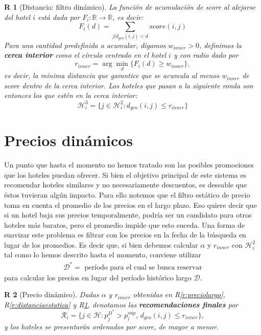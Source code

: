 \documentclass[12pt]{report}
\newcommand{\R}{\mathbb{R}}
\newcommand{\HH}{\mathcal{H}}
\newcommand{\RR}{\mathcal{R}}
\newtheorem{regla}{R}%
\begin{document}
\begin{regla}[Distancia: filtro dinámico] \label{r:distanciadinamica}
La función de acumulación de score al alejarse del hotel $i$ está dada por $F_i: \R \to \R$, es decir:
\[
F_i(d) = \sum_{j | d_{geo}(i,j) < d} score(i,j)
\]
Para una cantidad predefinida a acumular, digamos $w_{inner} > 0$, definimos la \textbf{cerca interior} como el círculo centrado en el hotel $i$ y con radio dado por
\[
r_{inner} = \arg\min_d \{F_i(d) \geq w_{inner}\},
\]
es decir, la mínima distancia que garantice que se acumula al menos $w_{inner}$ de \emph{score} dentro de la cerca interior. Los hoteles que pasan a la siguiente ronda son entonces los que estén en la cerca interior:
\[
\HH_i^3 = \{j \in \HH_i^2 : d_{geo}(i,j) \leq r_{inner}\}
\]
\end{regla}

\section{Precios dinámicos}

Un punto que hasta el momento no hemos tratado son las posibles promociones que los hoteles puedan ofrecer. Si bien el objetivo principal de este sistema es recomendar hoteles similares y no necesariamente descuentos, es deseable que éstos tuvieran algún impacto. Para ello notemos que el filtro estático de precio toma en cuenta el promedio de los precios en el largo plazo. Eso quiere decir que si un hotel baja sus precios temporalmente, podría ser un candidato para otros hoteles más baratos, pero el promedio impide que esto suceda. Una forma de suavizar este problema es filtrar con los precios en la fecha de la búsqueda en lugar de los promedios. Es decir que, si bien debemos calcular $\alpha$ y $r_{inner}$ con $\HH_i^2$ tal como lo hemos descrito hasta el momento, conviene utilizar
\begin{align}
	\mathcal{D^*} = \text{ período para el cual se busca reservar}
\end{align}
para calcular los precios en lugar del período histórico largo $\mathcal{D}$.
\begin{regla}[Precio dinámico] \label{r:preciodinamico}
Dadas $\alpha$ y $r_{inner}$ obtenidas en R\ref{r:preciolargo}, R\ref{r:distanciaestatica} y R\ref{r:distanciadinamica}, denotamos las \textbf{recomendaciones finales} por
\[
\RR_i = \{j \in \HH : p^{D^*}_j > p^{sup}_i \text{,  } d_{geo}(i,j) \leq r_{inner}\},
\]
y los hoteles se presentarán ordenados por \emph{score}, de mayor a menor.
\end{regla}
\end{document}
